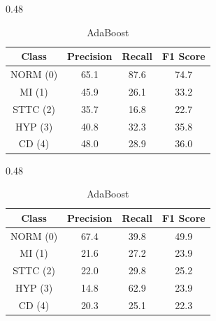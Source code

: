 \begin{table}[H]
    \begin{subtable}[t]{0.48\textwidth}
        \centering
        \caption{Histogram–based Gradient Boosting}
        \label{tab:cv_gb}
        \begin{tabular}{cccc}
            \toprule
            Class & Precision & Recall & F1 Score \\
            \midrule
            NORM (0) & 65.1 & 87.6 & 74.7 \\
            MI   (1) & 45.9 & 26.1 & 33.2 \\
            STTC (2) & 35.7 & 16.8 & 22.7 \\
            HYP  (3) & 40.8 & 32.3 & 35.8 \\
            CD   (4) & 48.0 & 28.9 & 36.0 \\
            \bottomrule
        \end{tabular}
    \end{subtable}
    \hfill
    \begin{subtable}[t]{0.48\textwidth}
        \centering
        \caption{AdaBoost}
        \label{tab:cv_ada}
        \begin{tabular}{cccc}
            \toprule
            Class & Precision & Recall & F1 Score \\
            \midrule
            NORM (0) & 67.4 & 39.8 & 49.9 \\
            MI   (1) & 21.6 & 27.2 & 23.9 \\
            STTC (2) & 22.0 & 29.8 & 25.2 \\
            HYP  (3) & 14.8 & 62.9 & 23.9 \\
            CD   (4) & 20.3 & 25.1 & 22.3 \\
            \bottomrule
        \end{tabular}
    \end{subtable}

    \bigskip


\end{table}
